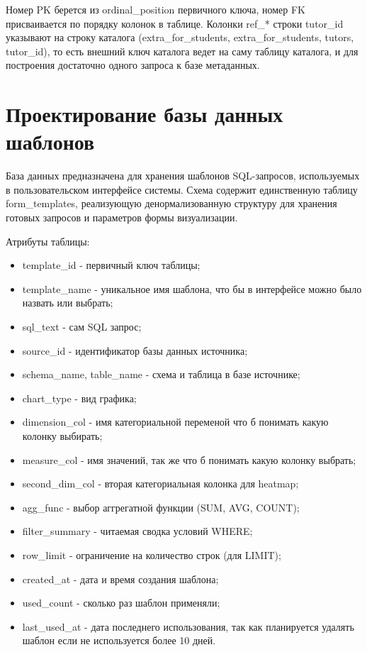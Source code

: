 \documentclass[areasetadvanced]{scrartcl}
\begin{document}
Номер PK берется из ordinal\_position первичного ключа, номер FK присваивается по порядку колонок в таблице. Колонки ref\_*
строки tutor\_id указывают на строку каталога (extra\_for\_students, extra\_for\_students, tutors, tutor\_id), то есть
внешний ключ каталога ведет на саму таблицу каталога, и для построения достаточно одного запроса к базе метаданных.

\newpage
\section{Проектирование базы данных шаблонов}

База данных предназначена для хранения шаблонов SQL-запросов, используемых в пользовательском интерфейсе системы. Схема содержит единственную таблицу form\_templates, 
реализующую денормализованную структуру для хранения готовых запросов и параметров формы визуализации. 

Атрибуты таблицы: 
\begin{itemize}
    \item template\_id - первичный ключ таблицы;
    \item template\_name - уникальное имя шаблона, что бы в интерфейсе можно было назвать или выбрать; 
    \item sql\_text - сам SQL запрос;
    \item source\_id - идентификатор базы данных источника;
    \item schema\_name, table\_name - схема и таблица в базе источнике;
    \item chart\_type - вид графика;
    \item dimension\_col - имя категориальной переменой что б понимать какую колонку выбирать;
    \item measure\_col - имя значений, так же что б понимать какую колонку выбрать;
    \item second\_dim\_col - вторая категориальная колонка для heatmap; 
    \item agg\_func - выбор аггрегатной функции (SUM, AVG, COUNT);
    \item filter\_summary - читаемая сводка условий WHERE;
    \item row\_limit - ограничение на количество строк (для LIMIT);
    \item created\_at - дата и время создания шаблона;
    \item used\_count - сколько раз шаблон применяли;
    \item last\_used\_at - дата последнего использования, так как планируется удалять шаблон если не используется более 10 дней. 
\end{itemize}
\end{document}
